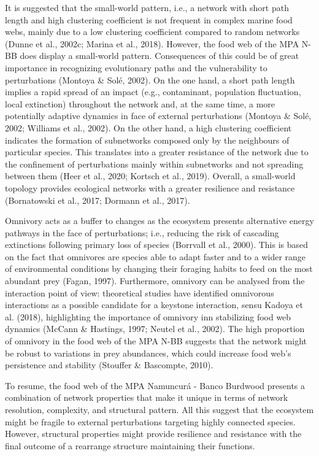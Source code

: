 \documentclass[preprint, 3p,
authoryear]{elsarticle} %
\begin{document}
It is suggested that the small-world pattern, i.e., a network with short
path length and high clustering coefficient is not frequent in complex
marine food webs, mainly due to a low clustering coefficient compared to
random networks (Dunne et al., 2002c; Marina et al., 2018). However, the
food web of the MPA N-BB does display a small-world pattern.
Consequences of this could be of great importance in recognizing
evolutionary paths and the vulnerability to perturbations (Montoya \&
Solé, 2002). On the one hand, a short path length implies a rapid spread
of an impact (e.g., contaminant, population fluctuation, local
extinction) throughout the network and, at the same time, a more
potentially adaptive dynamics in face of external perturbations (Montoya
\& Solé, 2002; Williams et al., 2002). On the other hand, a high
clustering coefficient indicates the formation of subnetworks composed
only by the neighbours of particular species. This translates into a
greater resistance of the network due to the confinement of
perturbations mainly within subnetworks and not spreading between them
(Heer et al., 2020; Kortsch et al., 2019). Overall, a small-world
topology provides ecological networks with a greater resilience and
resistance (Bornatowski et al., 2017; Dormann et al., 2017).

Omnivory acts as a buffer to changes as the ecosystem presents
alternative energy pathways in the face of perturbations; i.e., reducing
the risk of cascading extinctions following primary loss of species
(Borrvall et al., 2000). This is based on the fact that omnivores are
species able to adapt faster and to a wider range of environmental
conditions by changing their foraging habits to feed on the most
abundant prey (Fagan, 1997). Furthermore, omnivory can be analysed from
the interaction point of view: theoretical studies have identified
omnivorous interactions as a possible candidate for a keystone
interaction, sensu Kadoya et al. (2018), highlighting the importance of
omnivory inn stabilizing food web dynamics (McCann \& Hastings, 1997;
Neutel et al., 2002). The high proportion of omnivory in the food web of
the MPA N-BB suggests that the network might be robust to variations in
prey abundances, which could increase food web's persistence and
stability (Stouffer \& Bascompte, 2010).

To resume, the food web of the MPA Namuncurá - Banco Burdwood presents a
combination of network properties that make it unique in terms of
network resolution, complexity, and structural pattern. All this suggest
that the ecosystem might be fragile to external perturbations targeting
highly connected species. However, structural properties might provide
resilience and resistance with the final outcome of a rearrange
structure maintaining their functions.
\end{document}
